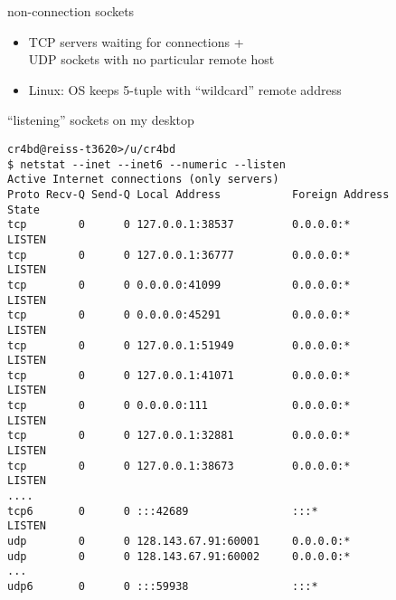 \begin{frame}{non-connection sockets}
\begin{itemize}
\item TCP servers waiting for connections + \\
UDP sockets with no particular remote host
\item Linux: OS keeps 5-tuple with ``wildcard'' remote address
\end{itemize}
\end{frame}

\begin{frame}[fragile,label=laptopNetstatListen]{``listening'' sockets on my desktop}
\begin{lstlisting}[language={},basicstyle=\fontsize{9.5}{10.5}\selectfont]
cr4bd@reiss-t3620>/u/cr4bd
$ netstat --inet --inet6 --numeric --listen
Active Internet connections (only servers)
Proto Recv-Q Send-Q Local Address           Foreign Address         State      
tcp        0      0 127.0.0.1:38537         0.0.0.0:*               LISTEN     
tcp        0      0 127.0.0.1:36777         0.0.0.0:*               LISTEN     
tcp        0      0 0.0.0.0:41099           0.0.0.0:*               LISTEN     
tcp        0      0 0.0.0.0:45291           0.0.0.0:*               LISTEN     
tcp        0      0 127.0.0.1:51949         0.0.0.0:*               LISTEN     
tcp        0      0 127.0.0.1:41071         0.0.0.0:*               LISTEN     
tcp        0      0 0.0.0.0:111             0.0.0.0:*               LISTEN     
tcp        0      0 127.0.0.1:32881         0.0.0.0:*               LISTEN     
tcp        0      0 127.0.0.1:38673         0.0.0.0:*               LISTEN     
....
tcp6       0      0 :::42689                :::*                    LISTEN
udp        0      0 128.143.67.91:60001     0.0.0.0:*
udp        0      0 128.143.67.91:60002     0.0.0.0:*
...
udp6       0      0 :::59938                :::* 
\end{lstlisting}
\end{frame}
